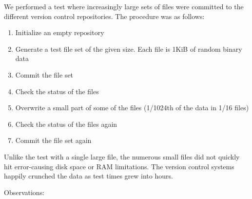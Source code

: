 \iffalse

We performed a test where increasingly large sets of files were committed to the
different version control repositories. The procedure was as follows:

\begin{enumerate}
    \setlength{\itemsep}{0pt}
    \setlength{\parskip}{0pt}
    \setlength{\parsep}{0pt}
    \item Initialize an empty repository
    \item Generate a test file set of the given size. Each file is 1KiB of
        random binary data
    \item Commit the file set
    \item Check the status of the files
    \item Overwrite a small part of some of the files (1/1024th of the data in
        1/16 files)
    \item Check the status of the files again
    \item Commit the file set again
\end{enumerate}

Unlike the test with a single large file, the numerous small files did not
quickly hit error-causing disk space or RAM limitations. The version control
systems happily crunched the data as test times grew into hours.

Observations:

